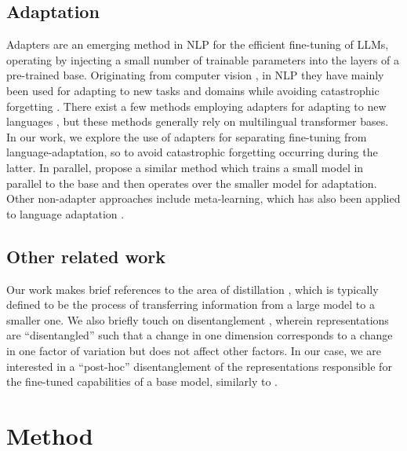 \documentclass[11pt]{article}
\begin{document}
\subsection{Adaptation}

Adapters \citep{houlsby_parameter-efficient_2019} are an emerging method in NLP for the efficient
fine-tuning of LLMs, operating by injecting a small number of trainable parameters into the layers
of a pre-trained base. Originating from computer vision \citep{rebuffi_learning_2017}, in NLP they
have mainly been used for adapting to new tasks \citep{stickland_bert_2019} and domains
\citep{bapna_simple_2019} while avoiding catastrophic forgetting
\citep{mccloskey_catastrophic_1989}. There exist a few methods employing adapters for adapting to
new languages \citep{pfeiffer_mad-x_2020, ustun_hyper-x_2022}, but these methods generally rely on
multilingual transformer bases. In our work, we explore the use of adapters for separating
fine-tuning from language-adaptation, so to avoid catastrophic forgetting occurring during the
latter. In parallel, \citet{marchisio_mini-model_2022} propose a similar method which trains a small
model in parallel to the base and then operates over the smaller model for adaptation. Other
non-adapter approaches include meta-learning, which has also been applied to language adaptation
\citep{nooralahzadeh_zero-shot_2020}.

\subsection{Other related work}

Our work makes brief references to the area of distillation \citep{hinton_distilling_2015}, which is
typically defined to be the process of transferring information from a large model to a smaller one.
We also briefly touch on disentanglement \citep{bengio_representation_2013}, wherein representations
are ``disentangled'' such that a change in one dimension corresponds to a change in one factor of
variation but does not affect other factors. In our case, we are interested in a ``post-hoc''
disentanglement of the representations responsible for the fine-tuned capabilities of a base model,
similarly to \citet{khrulkov_disentangled_2021}.

\section{Method}\label{sec:method}
\end{document}
